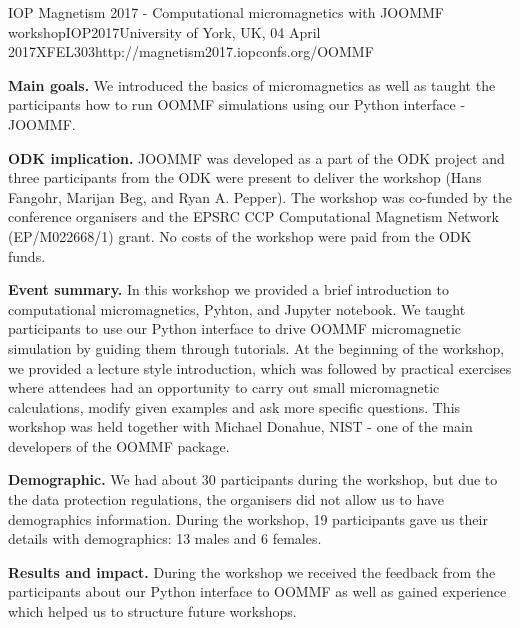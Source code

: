 \begin{event}{IOP Magnetism 2017 - Computational micromagnetics with JOOMMF workshop}{IOP2017}{University of York, UK, 04 April 2017}{XFEL}{30}{3}{http://magnetism2017.iopconfs.org/OOMMF}

\textbf{Main goals.} We introduced the basics of micromagnetics as well as taught the participants how to run OOMMF simulations using our Python interface - JOOMMF.

\textbf{ODK implication.} JOOMMF was developed as a part of the ODK project and three participants from the ODK were present to deliver the workshop (Hans Fangohr, Marijan Beg, and Ryan A. Pepper). The workshop was co-funded by the conference organisers and the EPSRC CCP Computational Magnetism Network (EP/M022668/1) grant. No costs of the workshop were paid from the ODK funds.

\textbf{Event summary.} In this workshop we provided a brief introduction to computational micromagnetics, Pyhton, and Jupyter notebook. We taught participants to use our Python interface to drive OOMMF micromagnetic simulation by guiding them through tutorials. At the beginning of the workshop, we provided a lecture style introduction, which was followed by practical exercises where attendees had an opportunity to carry out small micromagnetic calculations, modify given examples and ask more specific questions. This workshop was held together with Michael Donahue, NIST - one of the main developers of the OOMMF package.

\textbf{Demographic.} We had about 30 participants during the workshop, but due to the data protection regulations, the organisers did not allow us to have demographics information. During the workshop, 19 participants gave us their details with demographics: 13 males and 6 females.

\textbf{Results and impact.} During the workshop we received the feedback from the participants about our Python interface to OOMMF as well as gained experience which helped us to structure future workshops.

\end{event}
